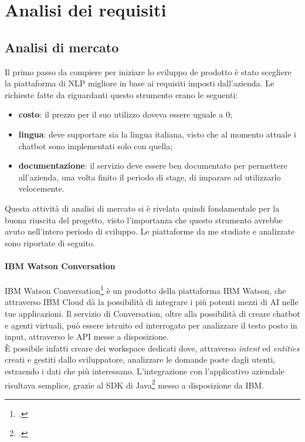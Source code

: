 
\chapter{Analisi dei requisiti}
\label{cap:analisi}

\section{Analisi di mercato}
Il primo passo da compiere per iniziare lo sviluppo de prodotto è stato scegliere la piattaforma di \gls{NLP} migliore in base ai requisiti imposti dall'azienda. Le richieste fatte da \azienda{} riguardanti questo strumento erano le seguenti:
\begin{itemize}
	\item \textbf{costo}: il prezzo per il suo utilizzo doveva essere uguale a 0;
	\item \textbf{lingua}: deve supportare sia la lingua italiana, visto che al momento attuale i \gls{chatbot} sono implementati solo con quella;
	\item \textbf{documentazione}: il servizio deve essere ben documentato per permettere all'azienda, una volta finito il periodo di stage, di imparare ad utilizzarlo velocemente.
\end{itemize}

Questa attività di analisi di mercato si è rivelata quindi fondamentale per la buona riuscita del progetto, visto l'importanza che questo strumento avrebbe avuto nell'intero periodo di sviluppo. Le piattaforme da me studiate e analizzate sono riportate di seguito.

\subsubsection{IBM Watson Conversation}
IBM Watson Conversation\footcite{watson} è un prodotto della piattaforma IBM Watson, che attraverso IBM Cloud dà la possibilità di integrare i più potenti mezzi di AI nelle tue applicazioni. Il servizio di Conversation, oltre alla possibilità di creare \gls{chatbot} e agenti virtuali, può essere istruito ed interrogato per analizzare il testo posto in input, attraverso le \gls{API} messe a disposizione.\\
È possibile infatti creare dei workspace dedicati dove, attraverso \emph{intent} ed \emph{entities} creati e gestiti dallo sviluppatore, analizzare le domande poste dagli utenti, estraendo i dati che più interessano. L'integrazione con l'applicativo aziendale risultava semplice, grazie al SDK di Java\footcite{watsonSDK} messo a disposizione da IBM.

